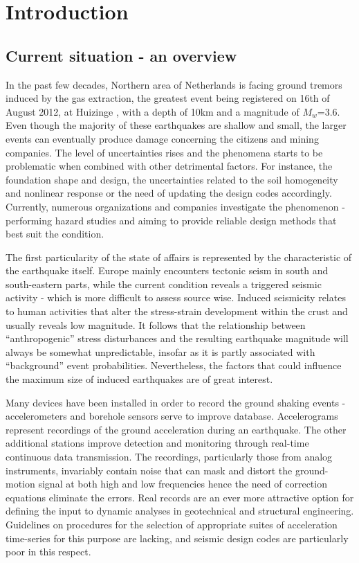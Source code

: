 \documentclass[10pt,a4paper]{report}
\begin{document}
\tableofcontents
	
\chapter{Introduction}
\section{Current situation - an overview}
In the past few decades, Northern area of Netherlands is facing ground tremors induced by the gas extraction, the greatest event being registered on 16th of August 2012, at Huizinge \cite{dost2013august}, with a depth of 10km and a magnitude of $M_w$=3.6. Even though the majority of these earthquakes are shallow and small, the larger events can eventually produce damage concerning the citizens and mining companies. The level of uncertainties rises and the phenomena starts to be problematic when combined with other detrimental factors. For instance, the foundation shape and design, the uncertainties related to the soil homogeneity and nonlinear response or the need of updating the design codes accordingly. Currently, numerous organizations and companies investigate the phenomenon - performing hazard studies and aiming to provide reliable design methods that best suit the condition. 

The first particularity of the state of affairs is represented by the characteristic of the earthquake itself. Europe mainly encounters tectonic seism in south and south-eastern parts, while the current condition reveals a triggered seismic activity - which is more difficult to assess source wise. Induced seismicity relates to human activities that alter the stress-strain development within the crust and usually reveals low magnitude. It follows that the relationship between “anthropogenic” stress disturbances and the resulting earthquake magnitude will always be somewhat unpredictable, insofar as it is partly associated with “background” event probabilities. Nevertheless, the factors that could influence the maximum size of induced earthquakes are of great interest. 

Many devices have been installed in order to record the ground shaking events - accelerometers and borehole sensors serve to improve database. Accelerograms represent recordings of the ground acceleration during an earthquake. The other additional stations improve detection and monitoring through real-time continuous data transmission. The recordings, particularly those from analog instruments, invariably contain noise that can mask and distort the ground-motion signal at both high and low frequencies hence the need of correction equations eliminate the errors.  Real records are an ever more attractive option for defining the input to dynamic analyses in geotechnical and structural engineering. Guidelines on procedures for the selection of appropriate suites of acceleration time-series for this purpose are lacking, and seismic design codes are particularly poor in this respect. 
\end{document}
